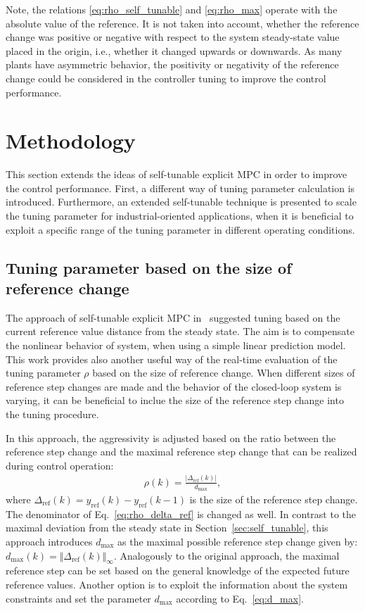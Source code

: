 \documentclass[preprint,12pt]{elsarticle}
\begin{document}
Note, the relations \eqref{eq:rho_self_tunable} and \eqref{eq:rho_max} operate with the absolute value of the reference. It is not taken into account, whether the reference change was positive or negative with respect to the system steady-state value placed in the origin, i.e., whether it changed upwards or downwards. As many plants have asymmetric behavior, the positivity or negativity of the reference change could be considered in the controller tuning to improve the control performance.
    

\section{Methodology}
\label{sec:methodology}
This section extends the ideas of self-tunable explicit MPC in order to improve the control performance. First, a different way of tuning parameter calculation is introduced. Furthermore, an extended self-tunable technique is presented to scale the tuning parameter for industrial-oriented applications, when it is beneficial to exploit a specific range of the tuning parameter in different operating conditions. 


\subsection{Tuning parameter based on the size of reference change}
\label{sec:self_tunable_delta_ref}
The approach of self-tunable explicit MPC in~\cite{self_tunable} suggested tuning based on the current reference value distance from the steady state. The aim is to compensate the nonlinear behavior of system, when using a simple linear prediction model. This work provides also another useful way of the real-time evaluation of the tuning parameter $\rho$ based on the size of reference change. When different sizes of reference step changes are made and the behavior of the closed-loop system is varying, it can be beneficial to inclue the size of the reference step change into the tuning procedure.

In this approach, the aggressivity is adjusted based on the ratio between the reference step change and the maximal reference step change that can be realized during control operation:
\begin{eqnarray}
	\label{eq:rho_delta_ref}
	\rho(k) = \frac{\vert \Delta_{\mathrm{ref}}(k) \vert}{d_{\max}},
\end{eqnarray} 
where $\Delta_{\mathrm{ref}}(k) = y_{\mathrm{ref}}(k) - y_{\mathrm{ref}}(k-1)$ is the size of the reference step change. The denominator of Eq.~\eqref{eq:rho_delta_ref} is changed as well. In contrast to the maximal deviation from the steady state in Section~\ref{sec:self_tunable}, this approach introduces $d_{\max}$ as the maximal possible reference step change given by: $  d_{\max}(k) = \Vert \Delta_{\mathrm{ref}}(k) \Vert_{\infty} $. 
Analogously to the original approach, the maximal reference step can be set based on the general knowledge of the expected future reference values. Another option is to exploit the information about the system constraints and set the parameter $d_{\max}$ according to Eq.~\eqref{eq:d_max}. 
 
\end{document}
